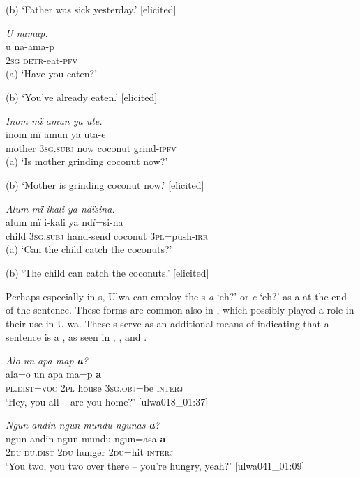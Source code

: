     (b) ‘Father was sick yesterday.’ [elicited]
\z

\ea%
    \label{ex:syntax:2}
           \textit{U namap.}\\
\gll    u    na-ama-p\\
    \textsc{2sg}  \textsc{detr}{}-eat-\textsc{pfv}\\
\glt    (a) ‘Have you eaten?’

    (b) ‘You’ve already eaten.’ [elicited]
\z

\ea%
    \label{ex:syntax:3}
            \textit{Inom mï amun ya ute.}\\
\gll    inom  mï      amun  ya      uta-e\\
    mother  3\textsc{sg.subj}  now  coconut  grind-\textsc{ipfv}\\
\glt    (a) ‘Is mother grinding coconut now?’

    (b) ‘Mother is grinding coconut now.’ [elicited]
\z

\ea%
    \label{ex:syntax:4}
            \textit{Alum mï ikali ya ndïsina.}\\
\gll    alum  mï      i-kali    ya      ndï=si-na\\
    child  \textsc{3sg.subj}  hand-send  coconut  \textsc{3pl=}push-\textsc{irr}\\
\glt    (a) ‘Can the child catch the coconuts?’

    (b) ‘The child can catch the coconuts.’ [elicited]
\z

Perhaps especially in s, Ulwa can employ the s \textit{a} ‘eh?’ or \textit{e} ‘eh?’ as a  at the end of the  sentence. These forms are common also in , which possibly played a role in their use in Ulwa. These s serve as an additional means of indicating that a sentence is a , as seen in , , and .

\ea%
    \label{ex:syntax:5}
            \textit{Alo un apa map \textbf{a}?}\\
\gll ala{}=o      un  apa    ma=p      \textbf{a}\\
    \textsc{pl.dist{}=voc} 2\textsc{pl}  house  3\textsc{sg.obj}=be  \textsc{interj}\\
\glt    ‘Hey, you all -- are you home?’ [ulwa018\_01:37]
\z

\ea%
    \label{ex:syntax:6}
            \textit{Ngun andin ngun mundu ngunas \textbf{a}?}\\
\gll ngun  andin    ngun  mundu  ngun=asa  \textbf{a}\\
    2\textsc{du}  \textsc{du.dist}  2\textsc{du}  hunger  2\textsc{du}=hit  \textsc{interj}\\
\glt `You two, you two over there -- you’re hungry, yeah?’ [ulwa041\_01:09]
\z

